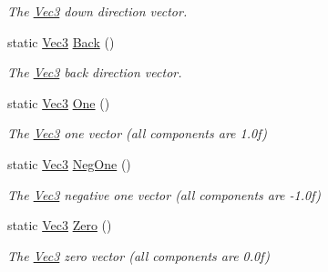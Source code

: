 \begin{DoxyCompactItemize}
\begin{DoxyCompactList}\small\item\em The \hyperlink{classgofxmath_1_1_vec3}{Vec3} down direction vector. \end{DoxyCompactList}\item 
\hypertarget{classgofxmath_1_1_vec3_a91e5bcac1a3a86bb052516490caca401}{}static \hyperlink{classgofxmath_1_1_vec3}{Vec3} \hyperlink{classgofxmath_1_1_vec3_a91e5bcac1a3a86bb052516490caca401}{Back} ()\label{classgofxmath_1_1_vec3_a91e5bcac1a3a86bb052516490caca401}

\begin{DoxyCompactList}\small\item\em The \hyperlink{classgofxmath_1_1_vec3}{Vec3} back direction vector. \end{DoxyCompactList}\item 
\hypertarget{classgofxmath_1_1_vec3_a5481fa38cda92462ae430f23cb98b40a}{}static \hyperlink{classgofxmath_1_1_vec3}{Vec3} \hyperlink{classgofxmath_1_1_vec3_a5481fa38cda92462ae430f23cb98b40a}{One} ()\label{classgofxmath_1_1_vec3_a5481fa38cda92462ae430f23cb98b40a}

\begin{DoxyCompactList}\small\item\em The \hyperlink{classgofxmath_1_1_vec3}{Vec3} one vector (all components are 1.\+0f) \end{DoxyCompactList}\item 
\hypertarget{classgofxmath_1_1_vec3_aec972e7480ca551b7ca3470417008c33}{}static \hyperlink{classgofxmath_1_1_vec3}{Vec3} \hyperlink{classgofxmath_1_1_vec3_aec972e7480ca551b7ca3470417008c33}{Neg\+One} ()\label{classgofxmath_1_1_vec3_aec972e7480ca551b7ca3470417008c33}

\begin{DoxyCompactList}\small\item\em The \hyperlink{classgofxmath_1_1_vec3}{Vec3} negative one vector (all components are -\/1.\+0f) \end{DoxyCompactList}\item 
\hypertarget{classgofxmath_1_1_vec3_a23a13d2b0b35f2ae6c3ead4acb050292}{}static \hyperlink{classgofxmath_1_1_vec3}{Vec3} \hyperlink{classgofxmath_1_1_vec3_a23a13d2b0b35f2ae6c3ead4acb050292}{Zero} ()\label{classgofxmath_1_1_vec3_a23a13d2b0b35f2ae6c3ead4acb050292}

\begin{DoxyCompactList}\small\item\em The \hyperlink{classgofxmath_1_1_vec3}{Vec3} zero vector (all components are 0.\+0f) \end{DoxyCompactList}\end{DoxyCompactItemize}
